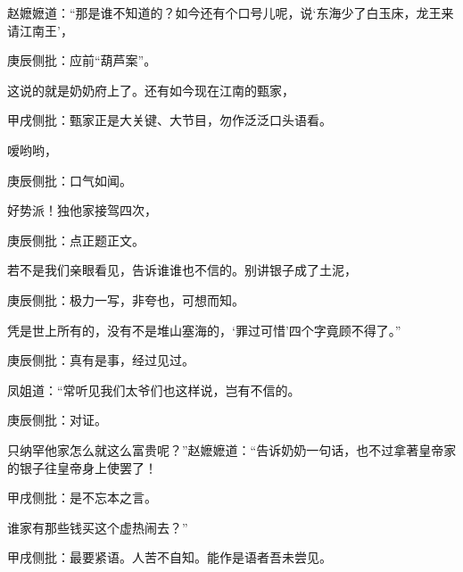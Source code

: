 \begin{parag}


    赵嬷嬷道：“那是谁不知道的？如今还有个口号儿呢，说‘东海少了白玉床，龙王来请江南王’，\begin{note}庚辰侧批：应前“葫芦案”。\end{note}这说的就是奶奶府上了。还有如今现在江南的甄家，\begin{note}甲戌侧批：甄家正是大关键、大节目，勿作泛泛口头语看。\end{note}嗳哟哟，\begin{note}庚辰侧批：口气如闻。\end{note}好势派！独他家接驾四次，\begin{note}庚辰侧批：点正题正文。\end{note}若不是我们亲眼看见，告诉谁谁也不信的。别讲银子成了土泥，\begin{note}庚辰侧批：极力一写，非夸也，可想而知。\end{note}凭是世上所有的，没有不是堆山塞海的，‘罪过可惜’四个字竟顾不得了。”\begin{note}庚辰侧批：真有是事，经过见过。\end{note}凤姐道：“常听见我们太爷们也这样说，岂有不信的。\begin{note}庚辰侧批：对证。\end{note}只纳罕他家怎么就这么富贵呢？”赵嬷嬷道：“告诉奶奶一句话，也不过拿著皇帝家的银子往皇帝身上使罢了！\begin{note}甲戌侧批：是不忘本之言。\end{note}谁家有那些钱买这个虚热闹去？”\begin{note}甲戌侧批：最要紧语。人苦不自知。能作是语者吾未尝见。\end{note}
\end{parag}


